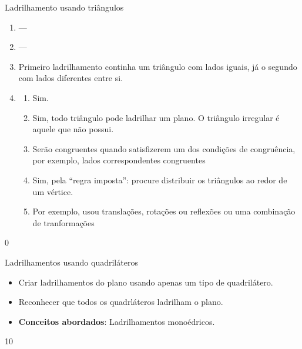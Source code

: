 \begin{answer}{Ladrilhamento usando triângulos}
{
	\begin{enumerate}
	\item ---
	\item ---
	\item Primeiro ladrilhamento continha um triângulo com lados iguais, já o segundo com lados diferentes entre si.
	\item 
	\begin{enumerate}
	    \item Sim.
		\item Sim, todo triângulo pode ladrilhar um plano. O triângulo irregular é aquele que não possui.
		\item Serão congruentes quando satisfizerem um dos condições de congruência, por exemplo, lados correspondentes congruentes
		\item Sim, pela “regra imposta”: procure distribuir os triângulos ao redor de um vértice.
		\item  Por exemplo,  usou translações, rotações ou reflexões ou uma combinação de tranformações
	\end{enumerate}
	\end{enumerate}
}{0}
\end{answer}
\clearmargin
\begin{objectives}{Ladrilhamentos usando quadriláteros}
{\begin{itemize}
	\item Criar ladrilhamentos do plano usando apenas um tipo de quadrilátero.
	\item Reconhecer que todos os quadrláteros ladrilham o plano.
	\item \textbf{Conceitos abordados}: Ladrilhamentos monoédricos.
\end{itemize}
}{1}{0}
\end{objectives}
